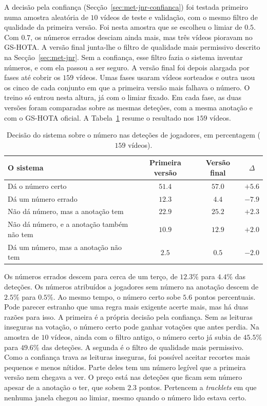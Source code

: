 A decisão pela confiança (Secção~\ref{sec:met-jnr-confianca}) foi testada primeiro numa amostra aleatória de $10$ vídeos de teste e validação, com o mesmo filtro de qualidade da primeira versão. Foi nesta amostra que se escolheu o limiar de $0.5$. Com $0.7$, os números errados desciam ainda mais, mas três vídeos pioravam no GS-HOTA. A versão final junta-lhe o filtro de qualidade mais permissivo descrito na Secção~\ref{sec:met-jnr}. Sem a confiança, esse filtro fazia o sistema inventar números, e com ela passou a ser seguro. A versão final foi depois alargada por fases até cobrir os $159$ vídeos. Umas fases usaram vídeos sorteados e outra usou os cinco de cada conjunto em que a primeira versão mais falhava o número. O treino só entrou nesta altura, já com o limiar fixado. Em cada fase, as duas versões foram comparadas sobre as mesmas deteções, com a mesma anotação e com o GS-HOTA oficial. A Tabela~\ref{tab:jnr-categorias} resume o resultado nos $159$ vídeos.

\begin{table}[H]
    \centering
    \caption{Decisão do sistema sobre o número nas deteções de jogadores, em percentagem ($159$ vídeos).}
    \label{tab:jnr-categorias}
    \begin{tabular}{|l|c|c|c|}
        \hline
        \textbf{O sistema} & \textbf{Primeira versão} & \textbf{Versão final} & \textbf{$\Delta$} \\
        \hline
        Dá o número certo                          & $51.4$ & $57.0$ & $+5.6$ \\
        \hline
        Dá um número errado                        & $12.3$ & $4.4$  & $-7.9$ \\
        \hline
        Não dá número, mas a anotação tem          & $22.9$ & $25.2$ & $+2.3$ \\
        \hline
        Não dá número, e a anotação também não tem & $10.9$ & $12.9$ & $+2.0$ \\
        \hline
        Dá um número, mas a anotação não tem       & $2.5$  & $0.5$  & $-2.0$ \\
        \hline
    \end{tabular}
\end{table}

Os números errados descem para cerca de um terço, de $12.3\%$ para $4.4\%$ das deteções. Os números atribuídos a jogadores sem número na anotação descem de $2.5\%$ para $0.5\%$. Ao mesmo tempo, o número certo sobe $5.6$ pontos percentuais. Pode parecer estranho que uma regra mais exigente acerte mais, mas há duas razões para isso. A primeira é a própria decisão pela confiança. Sem as leituras inseguras na votação, o número certo pode ganhar votações que antes perdia. Na amostra de $10$ vídeos, ainda com o filtro antigo, o número certo já subia de $45.5\%$ para $49.6\%$ das deteções. A segunda é o filtro de qualidade mais permissivo. Como a confiança trava as leituras inseguras, foi possível aceitar recortes mais pequenos e menos nítidos. Parte deles tem um número legível que a primeira versão nem chegava a ver. O preço está nas deteções que ficam sem número apesar de a anotação o ter, que sobem $2.3$ pontos. Pertencem a \emph{tracklets} em que nenhuma janela chegou ao limiar, mesmo quando o número lido estava certo.


